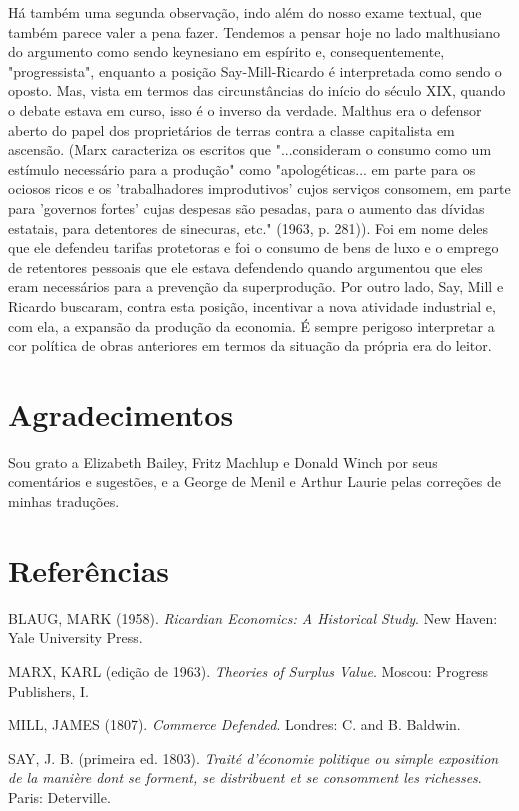\documentclass[12pt]{article}
\begin{document}
Há também uma segunda observação, indo além do nosso exame textual, que também parece valer a pena fazer. Tendemos a pensar hoje no lado malthusiano do argumento como sendo keynesiano em espírito e, consequentemente, "progressista", enquanto a posição Say-Mill-Ricardo é interpretada como sendo o oposto. Mas, vista em termos das circunstâncias do início do século XIX, quando o debate estava em curso, isso é o inverso da verdade. Malthus era o defensor aberto do papel dos proprietários de terras contra a classe capitalista em ascensão. (Marx caracteriza os escritos que "...consideram o consumo como um estímulo necessário para a produção" como "apologéticas... em parte para os ociosos ricos e os 'trabalhadores improdutivos' cujos serviços consomem, em parte para 'governos fortes' cujas despesas são pesadas, para o aumento das dívidas estatais, para detentores de sinecuras, etc." (1963, p. 281)). Foi em nome deles que ele defendeu tarifas protetoras e foi o consumo de bens de luxo e o emprego de retentores pessoais que ele estava defendendo quando argumentou que eles eram necessários para a prevenção da superprodução. Por outro lado, Say, Mill e Ricardo buscaram, contra esta posição, incentivar a nova atividade industrial e, com ela, a expansão da produção da economia. É sempre perigoso interpretar a cor política de obras anteriores em termos da situação da própria era do leitor.

\section*{Agradecimentos}

Sou grato a Elizabeth Bailey, Fritz Machlup e Donald Winch por seus comentários e sugestões, e a George de Menil e Arthur Laurie pelas correções de minhas traduções.

\section*{Referências}

\noindent BLAUG, MARK (1958). \textit{Ricardian Economics: A Historical Study}. New Haven: Yale University Press.

\noindent MARX, KARL (edição de 1963). \textit{Theories of Surplus Value}. Moscou: Progress Publishers, I.

\noindent MILL, JAMES (1807). \textit{Commerce Defended}. Londres: C. and B. Baldwin.

\noindent SAY, J. B. (primeira ed. 1803). \textit{Traité d'économie politique ou simple exposition de la manière dont se forment, se distribuent et se consomment les richesses}. Paris: Deterville.
\end{document}
